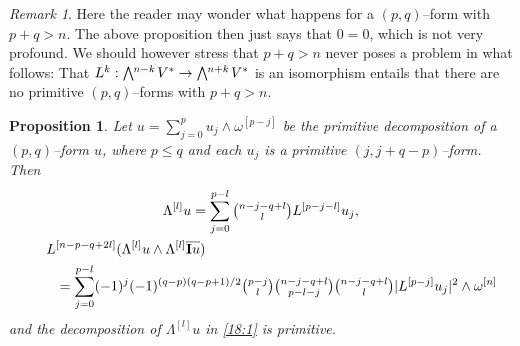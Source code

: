 \documentclass[11pt,a4paper]{amsart}
\def\^#1{^{[#1]}}
\def\bw#1{\bigwedge{}^{\mkern-5mu #1}\mkern2mu}
\def\I{\mathbf{I}}
\newtheorem{prop}[theo]{Proposition}
\theoremstyle{definition}
\theoremstyle{remark}
\newtheorem{rema}[theo]{Remark}
\numberwithin{equation}{section}
\begin{document}
\begin{rema}
  Here the reader may wonder what happens for a $(p,q)$--form with
$p+q > n$. The above proposition then just says that $0 = 0$, which is
not very profound. We should however stress that $p + q > n$ never
poses a problem in what follows: That $L^k : \bw{n-k} V^* \to \bw{n+k}
V^*$ is an isomorphism entails that there are no primitive
$(p,q)$--forms with $p + q > n$.
\end{rema}



\begin{prop}
    \label{prop:morphism}
Let $u = \sum_{j=0}^p u_j \wedge \omega\^{p-j}$ be the primitive
decomposition of a $(p,q)$--form $u$, where $p \leq q$ and each $u_j$ is a
primitive $(j,j+q-p)$--form. Then
\begin{gather}
  \label{18:1}
  \Lambda\^l u 
  = \sum_{j=0}^{p-l} \tbinom{n-j-q+l}{l} L\^{p-j-l} u_j , 
  \\
  L\^{n-p-q+2l}( \Lambda\^l u \wedge \Lambda\^l \overline{\I u})
  \kern 193pt
  \\
  \label{18:2}
  \kern 25pt
  = \sum_{j=0}^{p-l} 
  (-1)^j
  (-1)^{(q-p)(q-p+1)/2}
  \tbinom{p-j}{l}
  \tbinom{n-j-q+l}{p-l-j}
  \tbinom{n-j-q+l}{l}
  \lvert L\^{p-j} u_j \rvert^2
  \wedge \omega\^ n
  \notag
\end{gather}
and the decomposition of $\Lambda\^l u$ in \eqref{18:1} is primitive.
\end{prop}
\end{document}
